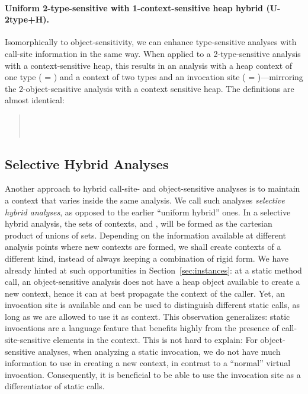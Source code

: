 
\paragraph{Uniform 2-type-sensitive with 1-context-sensitive heap hybrid (U-2type+H).}

Isomorphically to object-sensitivity, we can enhance type-sensitive
analyses with call-site information in the same way. When applied to a
2-type-sensitive analysis with a context-sensitive heap, this results
in an analysis with a heap context of one type ( = )
and a context of two types and an invocation site ( = )---mirroring the 2-object-sensitive analysis
with a context sensitive heap. The definitions are almost identical:
\begin{quote}
 \\
 \\
\end{quote}


\subsection{Selective Hybrid Analyses}

Another approach to hybrid call-site- and object-sensitive analyses is
to maintain a context that varies inside the same analysis. We call
such analyses \emph{selective hybrid analyses}, as opposed to the
earlier ``uniform hybrid'' ones. In a selective hybrid analysis, the
sets of contexts,  and , will be formed as the
cartesian product of unions of sets. Depending on the information
available at different analysis points where new contexts are formed,
we shall create contexts of a different kind, instead of always keeping
a combination of rigid form. We have already hinted at such
opportunities in Section~\ref{sec:instances}: at a static method call,
an object-sensitive analysis does not have a heap object available to
create a new context, hence it can at best propagate the context of
the caller. Yet, an invocation site is available and can be used to
distinguish different static calls, as long as we are allowed to use
it as context. This observation generalizes: static invocations are a
language feature that benefits highly from the presence of
call-site-sensitive elements in the context. This is not hard to
explain: For object-sensitive analyses, when analyzing a static
invocation, we do not have much information to use in creating a new
context, in contrast to a ``normal'' virtual invocation. Consequently,
it is beneficial to be able to use the invocation site as a
differentiator of static calls.

